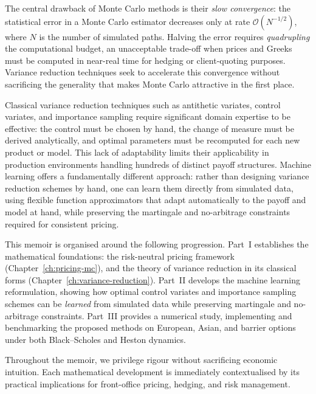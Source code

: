 \documentclass[12pt, a4paper]{report}
\theoremstyle{definition}
\begin{document}
The central drawback of Monte Carlo methods is their \emph{slow
convergence}: the statistical error in a Monte Carlo estimator decreases
only at rate $\mathcal{O}(N^{-1/2})$, where $N$ is the number of
simulated paths.  Halving the error requires \emph{quadrupling} the
computational budget, an unacceptable trade-off when prices and Greeks
must be computed in near-real time for hedging or client-quoting
purposes.  Variance reduction techniques seek to accelerate this
convergence without sacrificing the generality that makes Monte Carlo
attractive in the first place.

Classical variance reduction techniques such as antithetic variates,
control variates, and importance sampling require significant domain
expertise to be effective: the control must be chosen by hand, the change
of measure must be derived analytically, and optimal parameters must be
recomputed for each new product or model.  This lack of adaptability
limits their applicability in production environments handling hundreds
of distinct payoff structures.  Machine learning offers a fundamentally
different approach: rather than designing variance reduction schemes by
hand, one can learn them directly from simulated data, using flexible
function approximators that adapt automatically to the payoff and model
at hand, while preserving the martingale and no-arbitrage constraints
required for consistent pricing.

This memoir is organised around the following progression.  Part~I
establishes the mathematical foundations: the risk-neutral pricing
framework (Chapter~\ref{ch:pricing-mc}), and the theory of variance
reduction in its classical forms (Chapter~\ref{ch:variance-reduction}).
Part~II develops the machine learning reformulation, showing how optimal
control variates and importance sampling schemes can be \emph{learned}
from simulated data while preserving martingale and no-arbitrage
constraints.  Part~III provides a numerical study, implementing and
benchmarking the proposed methods on European, Asian, and barrier options
under both Black--Scholes and Heston dynamics.

Throughout the memoir, we privilege rigour without sacrificing economic
intuition.  Each mathematical development is immediately contextualised
by its practical implications for front-office pricing, hedging, and risk
management.

\end{document}
